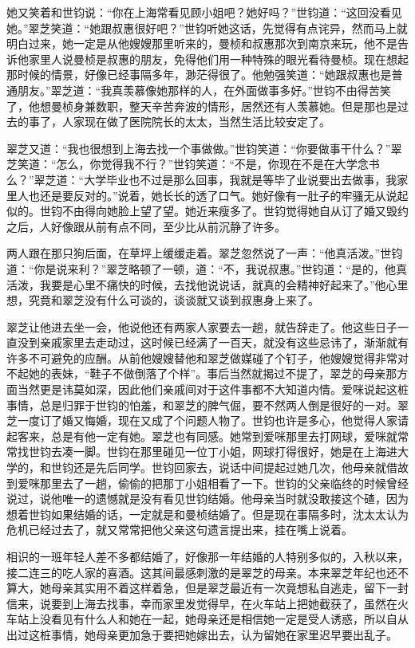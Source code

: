 \par 她又笑着和世钧说：“你在上海常看见顾小姐吧？她好吗？”世钧道：“这回没看见她。”翠芝笑道：“她跟叔惠很好吧？”世钧听她这话，先觉得有点诧异，然而马上就明白过来，她一定是从他嫂嫂那里听来的，曼桢和叔惠那次到南京来玩，他不是告诉他家里人说曼桢是叔惠的朋友，免得他们用一种特殊的眼光看待曼桢。现在想起那时候的情景，好像已经事隔多年，渺茫得很了。他勉强笑道：“她跟叔惠也是普通朋友。”翠芝道：“我真羡慕像她那样的人，在外面做事多好。”世钧不由得苦笑了，他想曼桢身兼数职，整天辛苦奔波的情形，居然还有人羡慕她。但是那也是过去的事了，人家现在做了医院院长的太太，当然生活比较安定了。
\par 翠芝又道：“我也很想到上海去找一个事做做。”世钧笑道：“你要做事干什么？”翠芝笑道：“怎么，你觉得我不行？”世钧笑道：“不是，你现在不是在大学念书么？”翠芝道：“大学毕业也不过是那么回事，我就是等毕了业说要出去做事，我家里人也还是要反对的。”说着，她长长的透了口气。她好像有一肚子的牢骚无从说起似的。世钧不由得向她脸上望了望。她近来瘦多了。世钧觉得她自从订了婚又毁约之后，人好像跟从前有点不同，至少比从前沉静了许多。
\par 两人跟在那只狗后面，在草坪上缓缓走着。翠芝忽然说了一声：“他真活泼。”世钧道：“你是说来利？”翠芝略顿了一顿，道：“不，我说叔惠。”世钧道：“是的，他真活泼，我要是心里不痛快的时候，去找他说说话，就真的会精神好起来了。”他心里想，究竟和翠芝没有什么可谈的，谈谈就又谈到叔惠身上来了。
\par 翠芝让他进去坐一会，他说他还有两家人家要去一趟，就告辞走了。他这些日子一直没到亲戚家里去走动过，这时候已经满了一百天，就没有这些忌讳了，渐渐就有许多不可避免的应酬。从前他嫂嫂替他和翠芝做媒碰了个钉子，他嫂嫂觉得非常对不起她的表妹，“鞋子不做倒落了个样”。事后当然就揭过不提了，翠芝的母亲那方面当然更是讳莫如深，因此他们亲戚间对于这件事都不大知道内情。爱咪说起这桩事情，总是归罪于世钧的怕羞，和翠芝的脾气倔，要不然两人倒是很好的一对。翠芝一度订了婚又悔婚，现在又成了个问题人物了。世钧也许是多心，他觉得人家请起客来，总是有他一定有她。翠芝也有同感。她常到爱咪那里去打网球，爱咪就常常找世钧去凑一脚。世钧在那里碰见一位丁小姐，网球打得很好，她是在上海进大学的，和世钧还是先后同学。世钧回家去，说话中间提起过她几次，他母亲就借故到爱咪那里去了一趟，偷偷的把那丁小姐相看了一下。世钧的父亲临终的时候曾经说过，说他唯一的遗憾就是没有看见世钧结婚。他母亲当时就没敢接这个碴，因为想着世钧如果结婚的话，一定就是和曼桢结婚了。但是现在事隔多时，沈太太认为危机已经过去了，就又常常把他父亲这句遗言提出来，挂在嘴上说着。
\par 相识的一班年轻人差不多都结婚了，好像那一年结婚的人特别多似的，入秋以来，接二连三的吃人家的喜酒。这其间最感刺激的是翠芝的母亲。本来翠芝年纪也还不算大，她母亲其实用不着这样着急，但是翠芝最近有一次竟想私自逃走，留下一封信来，说要到上海去找事，幸而家里发觉得早，在火车站上把她截获了，虽然在火车站上没看见有什么人和她在一起，她母亲还是相信她一定是受人诱惑，所以自从出过这桩事情，她母亲更加急于要把她嫁出去，认为留她在家里迟早要出乱子。
